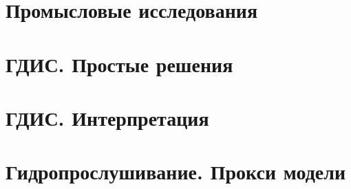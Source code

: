 \documentclass[oneside, openany]{memoir}
\begin{document}


\chapter{Промысловые исследования}









\chapter{ГДИС. Простые решения}




\chapter{ГДИС. Интерпретация}





\chapter{Гидропрослушивание. Прокси модели}









\printbibliography
\end{document}
